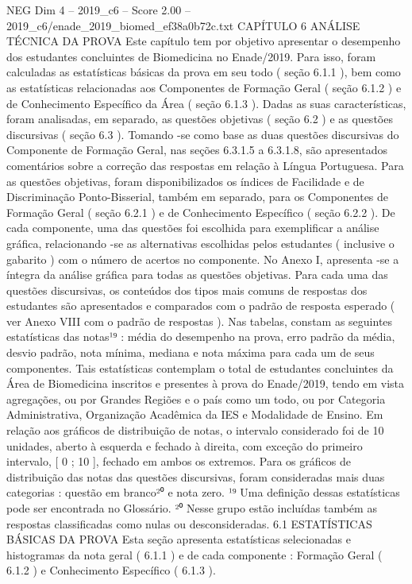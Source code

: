 \begin{textsample}{NEG Dim 4 – 2019\_c6 – Score 2.00 – 2019\_c6/enade\_2019\_biomed\_ef38a0b72c.txt}  \label{ex:f4_neg_265}
CAPÍTULO 6 ANÁLISE TÉCNICA DA PROVA Este capítulo tem por objetivo apresentar o desempenho dos estudantes concluintes de Biomedicina no Enade/2019.
Para isso, foram calculadas as estatísticas básicas da prova em seu todo ( seção 6.1.1 ), bem como as estatísticas relacionadas aos Componentes de Formação Geral ( seção 6.1.2 ) e de Conhecimento Específico da Área ( seção 6.1.3 ).
Dadas as suas características, foram analisadas, em separado, as questões objetivas ( seção 6.2 ) e as questões discursivas ( seção 6.3 ).
Tomando -se como base as duas questões discursivas do Componente de Formação Geral, nas seções 6.3.1.5 a 6.3.1.8, são apresentados comentários sobre a correção das respostas em relação à Língua Portuguesa.
Para as questões objetivas, foram disponibilizados os índices de Facilidade e de Discriminação Ponto-Bisserial, também em separado, para os Componentes de Formação Geral ( seção 6.2.1 ) e de Conhecimento Específico ( seção 6.2.2 ).
De cada componente, uma das questões foi escolhida para exemplificar a análise gráfica, relacionando -se as alternativas escolhidas pelos estudantes ( inclusive o gabarito ) com o número de acertos no componente.
No Anexo I, apresenta -se a íntegra da análise gráfica para todas as questões objetivas.
Para cada uma das questões discursivas, os conteúdos dos tipos mais comuns de respostas dos estudantes são apresentados e comparados com o padrão de resposta esperado ( ver Anexo VIII com o padrão de respostas ).
Nas tabelas, constam as seguintes estatísticas das notas¹⁹ : média do desempenho na prova, erro padrão da média, desvio padrão, nota mínima, mediana e nota máxima para cada um de seus componentes.
Tais estatísticas contemplam o total de estudantes concluintes da Área de Biomedicina inscritos e presentes à prova do Enade/2019, tendo em vista agregações, ou por Grandes Regiões e o país como um todo, ou por Categoria Administrativa, Organização Acadêmica da IES e Modalidade de Ensino.
Em relação aos gráficos de distribuição de notas, o intervalo considerado foi de 10 unidades, aberto à esquerda e fechado à direita, com exceção do primeiro intervalo, [ 0 ; 10 ], fechado em ambos os extremos.
Para os gráficos de distribuição das notas das questões discursivas, foram consideradas mais duas categorias : questão em branco²⁰ e nota zero. ¹⁹ Uma definição dessas estatísticas pode ser encontrada no Glossário. ²⁰ Nesse grupo estão incluídas também as respostas classificadas como nulas ou desconsideradas. 6.1 ESTATÍSTICAS BÁSICAS DA PROVA Esta seção apresenta estatísticas selecionadas e histogramas da nota geral ( 6.1.1 ) e de cada componente : Formação Geral ( 6.1.2 ) e Conhecimento Específico ( 6.1.3 ).

\end{textsample}
